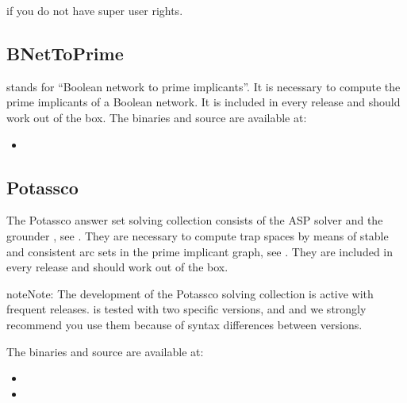\documentclass[letterpaper,10pt,english]{sphinxmanual}
\begin{document}
if you do not have super user rights.


\subsection{BNetToPrime}
\label{\detokenize{Installation:bnettoprime}}\label{\detokenize{Installation:installation-bnettoprime}}
 stands for “Boolean network to prime implicants”. It is necessary to compute the prime implicants of a Boolean network. It is included in every release and should work out of the box. The binaries and source are available at:
\begin{itemize}
\item {} 

\end{itemize}


\subsection{Potassco}
\label{\detokenize{Installation:installation-potassco}}\label{\detokenize{Installation:potassco}}
The Potassco answer set solving collection consists of the ASP solver  and the grounder , see {\hyperref[\detokenize{Bibliography:gebser2011}]{}}.
They are necessary to compute trap spaces by means of stable and consistent arc sets in the prime implicant graph, see {\hyperref[\detokenize{Bibliography:klarner2015trap}]{}}. They are included in every release and should work out of the box.

\begin{sphinxadmonition}{note}{Note:}
The development of the Potassco solving collection is active with frequent releases.
 is tested with two specific versions,  and  and we strongly recommend you use them because of syntax differences between versions.
\end{sphinxadmonition}

The binaries and source are available at:
\begin{itemize}
\item {} 

\item {} 

\end{itemize}
\end{document}
